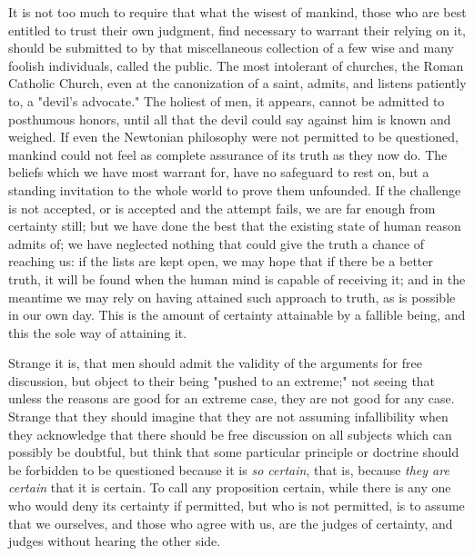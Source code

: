 \documentclass[12pt]{report}
\begin{document}
It is not too much to require that what the wisest of mankind, those who are best entitled to trust their own judgment, find necessary to warrant their relying on it, should be submitted to by that miscellaneous collection of a few wise and many foolish individuals, called the public. The most intolerant of churches, the Roman Catholic Church, even at the canonization of a saint, admits, and listens patiently to, a "devil's advocate." The holiest of men, it appears, cannot be admitted to posthumous honors, until all that the devil could say against him is known and weighed. If even the Newtonian philosophy were not permitted to be questioned, mankind could not feel as complete assurance of its truth as they now do. The beliefs which we have most warrant for, have no safeguard to rest on, but a standing invitation to the whole world to prove them unfounded. If the challenge is not accepted, or is accepted and the attempt fails, we are far enough from certainty still; but we have done the best that the existing state of human reason admits of; we have neglected nothing that could give the truth a chance of reaching us: if the lists are kept open, we may hope that if there be a better truth, it will be found when the human mind is capable of receiving it; and in the meantime we may rely on having attained such approach to truth, as is possible in our own day. This is the amount of certainty attainable by a fallible being, and this the sole way of attaining it.

Strange it is, that men should admit the validity of the arguments for free discussion, but object to their being "pushed to an extreme;" not seeing that unless the reasons are good for an extreme case, they are not good for any case. Strange that they should imagine that they are not assuming infallibility when they acknowledge that there should be free discussion on all subjects which can possibly be doubtful, but think that some particular principle or doctrine should be forbidden to be questioned because it is \emph{so certain}, that is, because \emph{they are certain} that it is certain. To call any proposition certain, while there is any one who would deny its certainty if permitted, but who is not permitted, is to assume that we ourselves, and those who agree with us, are the judges of certainty, and judges without hearing the other side.
\end{document}
